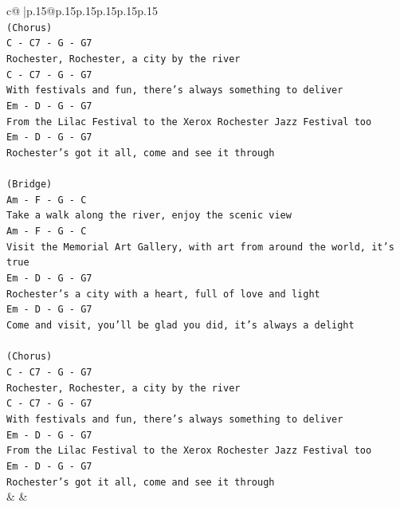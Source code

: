 \documentclass{article}
\begin{document}
{\begin{supertabular}{c@{$\;$}|p{.15\linewidth}@{}p{.15\linewidth}p{.15\linewidth}p{.15\linewidth}p{.15\linewidth}p{.15\linewidth}}
{{{\\ 
\texttt{(Chorus)} \\
\texttt{C {-} C7 {-} G {-} G7} \\
\texttt{Rochester, Rochester, a city by the river} \\
\texttt{C {-} C7 {-} G {-} G7} \\
\texttt{With festivals and fun, there's always something to deliver} \\
\texttt{Em {-} D {-} G {-} G7} \\
\texttt{From the Lilac Festival to the Xerox Rochester Jazz Festival too} \\
\texttt{Em {-} D {-} G {-} G7} \\
\texttt{Rochester's got it all, come and see it through} \\
\\ 
\texttt{(Bridge)} \\
\texttt{Am {-} F {-} G {-} C} \\
\texttt{Take a walk along the river, enjoy the scenic view} \\
\texttt{Am {-} F {-} G {-} C} \\
\texttt{Visit the Memorial Art Gallery, with art from around the world, it's true} \\
\texttt{Em {-} D {-} G {-} G7} \\
\texttt{Rochester's a city with a heart, full of love and light} \\
\texttt{Em {-} D {-} G {-} G7} \\
\texttt{Come and visit, you'll be glad you did, it's always a delight} \\
\\ 
\texttt{(Chorus)} \\
\texttt{C {-} C7 {-} G {-} G7} \\
\texttt{Rochester, Rochester, a city by the river} \\
\texttt{C {-} C7 {-} G {-} G7} \\
\texttt{With festivals and fun, there's always something to deliver} \\
\texttt{Em {-} D {-} G {-} G7} \\
\texttt{From the Lilac Festival to the Xerox Rochester Jazz Festival too} \\
\texttt{Em {-} D {-} G {-} G7} \\
\texttt{Rochester's got it all, come and see it through} \\
            }
        }
    }
    & & \\ \\


\end{supertabular}}
\end{document}
